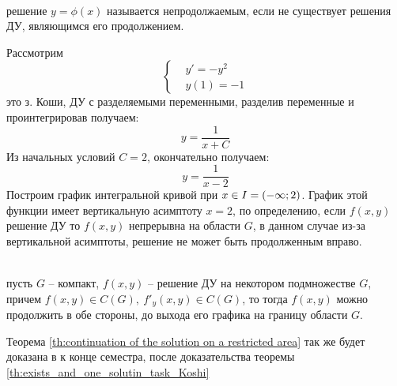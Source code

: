 \begin{Def}  \\
решение $y = \phi(x)$ называется непродолжаемым, если не существует решения ДУ, являющимся его продолжением.
\end{Def}
\begin{example}
Рассмотрим
\begin{equation}
    \left\{ \begin{aligned} 
    &y' = -y^2 \\
    &y(1) = -1
    \end{aligned}    \right.
\end{equation}
это з. Коши, ДУ с разделяемыми переменными, разделив переменные и проинтегрировав получаем:
\begin{equation}
    y = \frac{1}{x+C}
\end{equation}
Из начальных условий $C=2$, окончательно получаем:
\begin{equation}
    y = \frac{1}{x-2}
\end{equation}
Построим график интегральной кривой при $x \in I = (- \infty ; 2)$. График этой функции имеет вертикальную асимптоту $x = 2$, по определению, если $f(x, y)$ решение ДУ то $f(x, y)$ непрерывна на области $G$, в данном случае из-за вертикальной асимптоты, решение не может быть продолженным вправо.
\end{example}
\begin{theorem} \label{th:continuation of the solution on a restricted area}  \\
пусть $G$ -- компакт, $f(x, y)$ -- решение ДУ на некотором подмножестве  $G$, причем $f(x, y) \in C(G),~  f'_y(x, y) \in C(G)$, то тогда $f(x,y)$ можно продолжить в обе стороны, до выхода его графика на границу области $G$.
\end{theorem}
Теорема \ref{th:continuation of the solution on a restricted area} так же будет доказана в к конце семестра, после доказательства теоремы \ref{th:exists_and_one_solutin_task_Koshi}